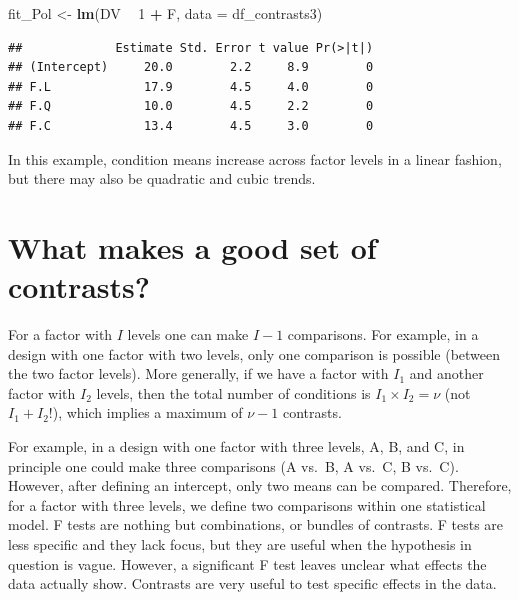 \documentclass[12pt,]{krantz}
\newenvironment{Shaded}{\begin{snugshade}}{\end{snugshade}}
\newcommand{\DataTypeTok}[1]{\textcolor[rgb]{0.13,0.29,0.53}{#1}}
\newcommand{\DecValTok}[1]{\textcolor[rgb]{0.00,0.00,0.81}{#1}}
\newcommand{\KeywordTok}[1]{\textcolor[rgb]{0.13,0.29,0.53}{\textbf{#1}}}
\newcommand{\NormalTok}[1]{#1}
\newcommand{\OperatorTok}[1]{\textcolor[rgb]{0.81,0.36,0.00}{\textbf{#1}}}
\newcommand{\StringTok}[1]{\textcolor[rgb]{0.31,0.60,0.02}{#1}}
\begin{document}
\begin{Shaded}
\begin{Highlighting}[]
\NormalTok{fit_Pol <-}\StringTok{ }\KeywordTok{lm}\NormalTok{(DV }\OperatorTok{~}\StringTok{ }\DecValTok{1} \OperatorTok{+}\StringTok{ }\NormalTok{F,}
                 \DataTypeTok{data =}\NormalTok{ df_contrasts3) }
\end{Highlighting}
\end{Shaded}

\begin{Shaded}
\end{Shaded}

\begin{verbatim}
##             Estimate Std. Error t value Pr(>|t|)
## (Intercept)     20.0        2.2     8.9        0
## F.L             17.9        4.5     4.0        0
## F.Q             10.0        4.5     2.2        0
## F.C             13.4        4.5     3.0        0
\end{verbatim}

In this example, condition means increase across factor levels in a linear fashion, but there may also be quadratic and cubic trends.

\hypertarget{nonOrthogonal}{%
\section{What makes a good set of contrasts?}\label{nonOrthogonal}}

For a factor with \(I\) levels one can make \(I-1\) comparisons. For example, in a design with one factor with two levels, only one comparison is possible (between the two factor levels). More generally, if we have a factor with \(I_1\) and another factor with \(I_2\) levels, then the total number of conditions is \(I_1\times I_2 = \nu\) (not \(I_1 + I_2\)!), which implies a maximum of \(\nu-1\) contrasts.

For example, in a design with one factor with three levels, A, B, and C, in principle one could make three comparisons (A vs.~B, A vs.~C, B vs.~C).
However, after defining an intercept, only two means can be compared. Therefore, for a factor with three levels, we define two comparisons within one statistical model.
F tests are nothing but combinations, or bundles of contrasts. F tests are less specific and they lack focus, but they are useful when the hypothesis in question is vague. However, a significant F test leaves unclear what effects the data actually show. Contrasts are very useful to test specific effects in the data.
\end{document}
